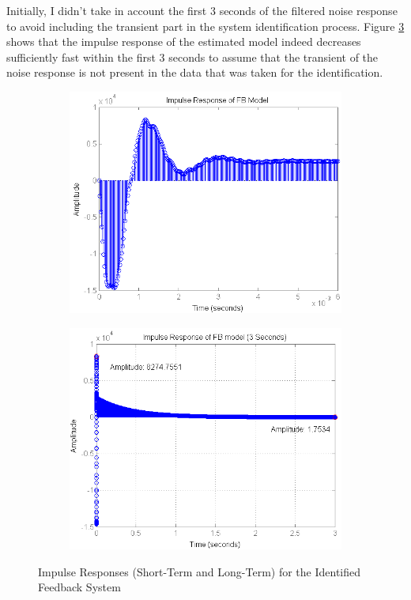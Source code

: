 Initially, I didn't take in account the first 3 seconds of the filtered noise response to avoid including the transient part in the system identification process. Figure \ref{fig:impulse_FB_3sec} shows that the impulse response of the estimated model indeed decreases sufficiently fast within the first 3 seconds to assume that the transient of the noise response is not present in the data that was taken for the identification.\\

\begin{figure}[h]
\centering
\begin{subfigure}[b]{0.5\textwidth}
\includegraphics[width=1.0\textwidth]{pics/impulse_FB}
\caption{}
\label{fig:impulse_FB}
\end{subfigure}\;\begin{subfigure}[b]{0.5\textwidth}
\includegraphics[width=1.0\textwidth]{pics/impulse_FB_3sec}
\caption{}
\label{fig:impulse_FB_3sec}
\end{subfigure}
\caption{Impulse Responses (Short-Term and Long-Term) for the Identified Feedback System}
\end{figure}

